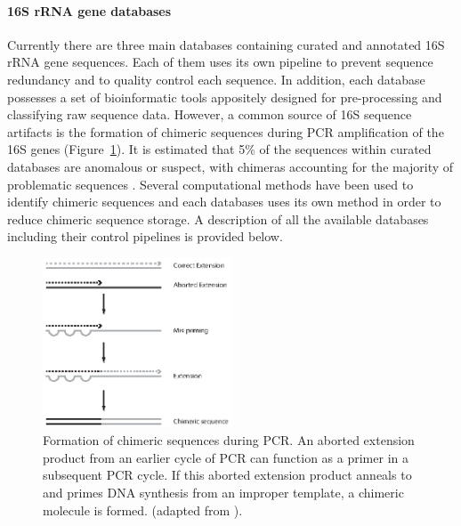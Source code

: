\paragraph{16S rRNA gene databases}
Currently there are three main databases containing curated and annotated 16S rRNA gene sequences. Each of them uses its own pipeline to prevent sequence redundancy and to quality control each sequence. In addition, each database possesses a set of bioinformatic tools appositely designed for pre-processing and classifying raw sequence data. However, a common source of 16S sequence artifacts is the formation of chimeric sequences during PCR amplification of the 16S genes (Figure~\ref{fig:chimeric}). It is estimated that 5\% of the sequences within curated databases are anomalous or suspect, with chimeras accounting for the majority of problematic sequences \cite{ashelford2005least}. Several computational methods have been used to identify chimeric sequences and each databases uses its own method in order to reduce chimeric sequence storage. A description of all the available databases including their control pipelines is provided below.\\
\begin{figure}[!tb]
	\centering
	\includegraphics[width=0.5\textwidth]{./figures/Introduction/chimeric_sequence}
  	\caption{Formation of chimeric sequences during PCR. An aborted extension product from an earlier cycle of PCR can function as a primer in a subsequent PCR cycle. If this aborted extension product anneals to and primes DNA synthesis from an improper template, a chimeric molecule is formed. (adapted from \cite{haas2011chimeric}).\label{fig:chimeric}}
\end{figure}


